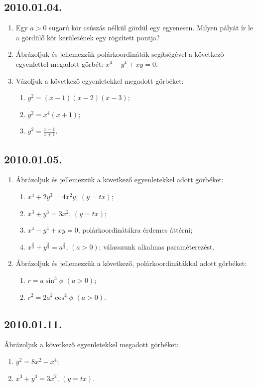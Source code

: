 \subsection*{2010.01.04.}
\begin{enumerate}
\item Egy $a>0$ sugarú kör csúszás nélkül gördül egy egyenesen. Milyen pályát ír le a gördülő kör kerületének egy rögzített pontja?
\item Ábrázoljuk és jellemezzük polárkoordináták segítségével a következő egyenlettel megadott görbét: $x^4-y^4+xy=0$.
\item Vázoljuk a következő egyenletekkel megadott görbéket:
\begin{enumerate}
\item $y^2=(x-1)(x-2)(x-3)$;
\item $y^2=x^4(x+1)$;
\item $y^2=\displaystyle \frac{x-1}{x+1}$.
\end{enumerate}
\end{enumerate}

\subsection*{2010.01.05.}
\begin{enumerate}
\item Ábrázoljuk és jellemezzük a következő egyenletekkel adott görbéket:
\begin{enumerate}
\item $x^4+2y^3=4x^2y$, $(y=tx)$;
\item $x^3+y^3=3x^2$, $(y=tx)$;
\item $x^4-y^4+xy=0$, polárkoordinátákra érdemes áttérni;
\item $x^{\frac{2}{3}}+y^{\frac{2}{3}}=a^{\frac{2}{3}}$, $(a>0)$; válasszunk alkalmas paraméterezést.
\end{enumerate}
\item Ábrázoljuk és jellemezzük a következő, polárkoordinátákkal adott görbéket:
\begin{enumerate}
\item $r=a\sin^3\phi$ $(a>0)$;
\item $r^2=2a^2\cos^2\phi$ $(a>0)$.
\end{enumerate}
\end{enumerate}

\subsection*{2010.01.11.}
Ábrázoljuk a következő egyenletekkel megadott görbéket:
\begin{enumerate}
\item $y^2=8x^2-x^4$;
\item $x^3+y^3=3x^2$, $(y=tx)$.
\end{enumerate}


